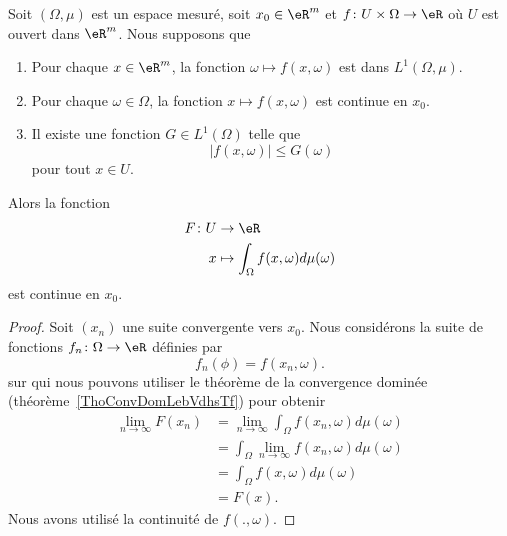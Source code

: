 \begin{theorem} \label{ThoKnuSNd}
    Soit \( (\Omega,\mu)\) est un espace mesuré, soit \( x_0\in \eR^m\) et \( f\colon U\times \Omega\to \eR\) où \( U\) est ouvert dans \( \eR^m\). Nous supposons que
    \begin{enumerate}
        \item
            Pour chaque \( x\in \eR^m\), la fonction \( \omega\mapsto f(x,\omega)\) est dans \( L^1(\Omega,\mu)\).
        \item
            Pour chaque \( \omega\in \Omega\), la fonction \( x\mapsto f(x,\omega)\) est continue en \( x_0\).
        \item       \label{ItemNAuYNG}
            Il existe une fonction \( G\in L^1(\Omega)\) telle que
            \begin{equation}
                | f(x,\omega) |\leq G(\omega)
            \end{equation}
            pour tout \( x\in U\).
    \end{enumerate}
    Alors la fonction
    \begin{equation}
        \begin{aligned}
            F\colon U&\to \eR \\
            x&\mapsto \int_{\Omega}f(x,\omega)d\mu(\omega)
        \end{aligned}
    \end{equation}
    est continue en \( x_0\).
\end{theorem}

\begin{proof}
    Soit \( (x_n)\) une suite convergente vers \( x_0\). Nous considérons la suite de fonctions \( f_n\colon \Omega\to \eR\) définies par
    \begin{equation}
        f_n(\phi)=f(x_n,\omega).
    \end{equation}
    sur qui nous pouvons utiliser le théorème de la convergence dominée (théorème~\ref{ThoConvDomLebVdhsTf}) pour obtenir
    \begin{subequations}
        \begin{align}
            \lim_{n\to \infty} F(x_n)&=\lim_{n\to \infty} \int_{\Omega}f(x_n,\omega)d\mu(\omega)\\
            &=\int_{\Omega}\lim_{n\to \infty} f(x_n,\omega)d\mu(\omega)\\
            &=\int_{\Omega}f(x,\omega)d\mu(\omega)\\
            &=F(x).
        \end{align}
    \end{subequations}
    Nous avons utilisé la continuité de \( f(.,\omega)\).
\end{proof}


